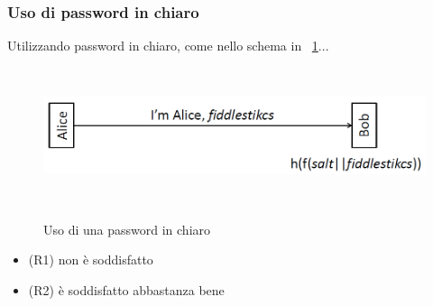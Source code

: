 \subsubsection{Uso di password in chiaro}
Utilizzando password in chiaro, come nello schema in \figurename~\ref{fig:ImgS43}...
\begin{figure}[htbp]
	\centering%
	\subfigure%
	{\includegraphics[height=4cm, width=12cm, keepaspectratio]{Immagini/autenticazione/ImgS43.png}}
	\caption{Uso di una password in chiaro\label{fig:ImgS43}} 	
\end{figure}
\begin{itemize}
	\item (R1) non è soddisfatto
	\item (R2) è soddisfatto abbastanza bene
\end{itemize}

